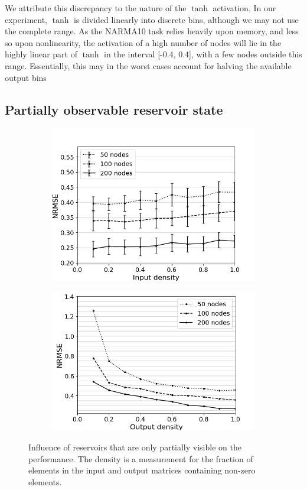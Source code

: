 We attribute this discrepancy to the nature of the $\tanh$ activation. In our
experiment, $\tanh$ is divided linearly into discrete bins, although we may not
use the complete range. As the NARMA10 task relies heavily upon memory, and less
so upon nonlinearity, the activation of a high number of nodes will lie in the
highly linear part of $\tanh$ in the interval [-0.4, 0.4], with a few nodes
outside this range. Essentially, this may in the worst cases account for halving
the available output bins

\subsection{Partially observable reservoir state}

\begin{figure}[htbp]
  \centering
  \begin{subfigure}{.49\textwidth}
    \centering
    \includegraphics[width=0.8\linewidth]{img/input_density_all.png}
    \caption{}
  \end{subfigure}
  \begin{subfigure}{.49\textwidth}
    \centering
    \includegraphics[width=0.8\linewidth]{img/output_density_all.png}
    \caption{}
  \end{subfigure}
  \caption{
    Influence of reservoirs that are only partially visible on the
performance. The density is a measurement for the fraction of elements in the
input and output matrices containing non-zero elements.
  }
  \label{partial_visibility}
\end{figure}

